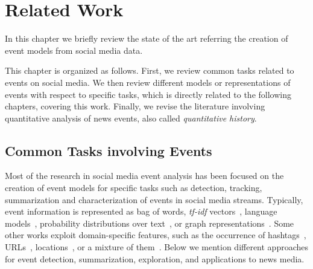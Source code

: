 \chapter{Related Work}


In this chapter we briefly review the state of the art referring the creation of
event models from social media data.
%

This chapter is organized as follows. 
%
First, we review common tasks related to events on social media. 
%
We then review different models or representations of events with respect to
specific tasks, which is directly related to the following chapters, covering
this work. 
%
Finally, we revise the literature involving quantitative analysis of news
events, also called {\em quantitative history}.



\section{Common Tasks involving Events}

Most of the research in social media event analysis has been focused on the
creation of event models for specific tasks such as detection, tracking,
summarization and characterization of events in social media streams. 
%
Typically, event information is represented as bag of words, {\em tf-idf}
vectors~\cite{tfidf,Marcus:2011:TAV:1978942.1978975}, language
models~\cite{zellers2019neuralfakenews}, probability distributions over
text~\cite{o2010tweetmotif,Hong:2010:EST:1964858.1964870,zhao2011comparing,Mehrotra:2013:ILT:2484028.2484166},
or graph
representations~\cite{Setty:2018:ENE:3209978.3210136,Lee:2013:KSK:2487575.2487711,Lee:2014:CCS:2661829.2661859}.
%
Some other works exploit domain-specific features, such as the occurrence of
hashtags~\cite{Kamath:2013:SDO:2488388.2488447},
URLs~\cite{Alonso:2015:WCW:2740908.2745397},
locations~\cite{Abdelhaq:EvenTweet:2013}, or a mixture of
them~\cite{castillo2011information}.
%
Below we mention different approaches for event detection, summarization,
exploration, and applications to news media.
%


